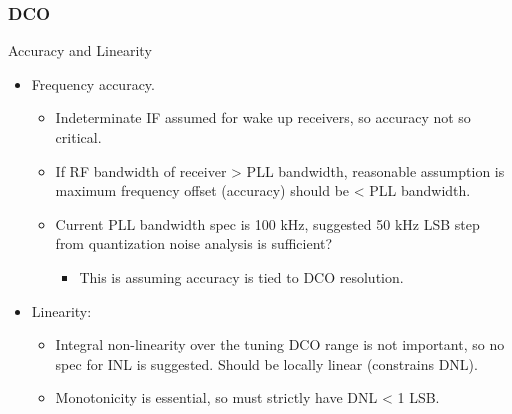 \documentclass[t, screen, aspectratio=43]{beamer}
\begin{document}
\begin{frame}
	\frametitle{DCO}
	\begin{block}{Accuracy and Linearity}
		\vspace{-.2em}
		\begin{itemize}
			\footnotesize
			\item Frequency accuracy.
				\begin{itemize}
					\scriptsize			
					\item Indeterminate IF assumed for wake up receivers, so accuracy not so critical.
					\item If RF bandwidth of receiver > PLL bandwidth, reasonable assumption is maximum frequency offset (accuracy) should be < PLL bandwidth.
					\item Current PLL bandwidth spec is 100 kHz, suggested 50 kHz LSB step from quantization noise analysis is sufficient?
					\begin{itemize}
						\scriptsize			
						\item This is assuming accuracy is tied to DCO resolution.
					\end{itemize} 
				\end{itemize} 	
			\item Linearity:
			\begin{itemize}
				\scriptsize			
				\item Integral non-linearity over the tuning DCO range is not important, so no spec for INL is suggested. Should be locally linear (constrains DNL).
				\item Monotonicity is essential, so must strictly have DNL < 1 LSB.
			\end{itemize} 
		\end{itemize}  
	\end{block}
\end{frame}

\end{document}

